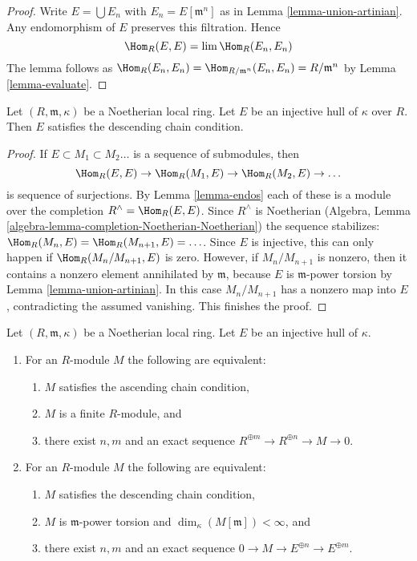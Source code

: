 \begin{proof}
Write $E = \bigcup E_n$ with $E_n = E[\mathfrak m^n]$ as in
Lemma \ref{lemma-union-artinian}. Any endomorphism of $E$
preserves this filtration. Hence
$$
\Hom_R(E, E) = \lim \Hom_R(E_n, E_n)
$$
The lemma follows as
$\Hom_R(E_n, E_n) = \Hom_{R/\mathfrak m^n}(E_n, E_n) = R/\mathfrak m^n$
by Lemma \ref{lemma-evaluate}.
\end{proof}

\begin{lemma}
\label{lemma-injective-hull-has-dcc}
Let $(R, \mathfrak m, \kappa)$ be a Noetherian local ring.
Let $E$ be an injective hull of $\kappa$ over $R$. Then
$E$ satisfies the descending chain condition.
\end{lemma}

\begin{proof}
If $E \subset M_1 \subset M_2 \ldots$ is a sequence of submodules, then
$$
\Hom_R(E, E) \to \Hom_R(M_1, E) \to \Hom_R(M_2, E) \to \ldots
$$
is sequence of surjections. By Lemma \ref{lemma-endos} each of these is a
module over the completion $R^\wedge = \Hom_R(E, E)$.
Since $R^\wedge$ is Noetherian
(Algebra, Lemma \ref{algebra-lemma-completion-Noetherian-Noetherian})
the sequence stabilizes: $\Hom_R(M_n, E) = \Hom_R(M_{n + 1}, E) = \ldots$.
Since $E$ is injective, this can only happen if $\Hom_R(M_n/M_{n + 1}, E)$
is zero. However, if $M_n/M_{n + 1}$ is nonzero, then it contains a
nonzero element annihilated by $\mathfrak m$, because $E$ is
$\mathfrak m$-power torsion by Lemma \ref{lemma-union-artinian}.
In this case $M_n/M_{n + 1}$ has a nonzero map into $E$, contradicting
the assumed vanishing. This finishes the proof.
\end{proof}

\begin{lemma}
\label{lemma-describe-categories}
Let $(R, \mathfrak m, \kappa)$ be a Noetherian local ring.
Let $E$ be an injective hull of $\kappa$.
\begin{enumerate}
\item For an $R$-module $M$ the following are equivalent:
\begin{enumerate}
\item $M$ satisfies the ascending chain condition,
\item $M$ is a finite $R$-module, and
\item there exist $n, m$ and an exact sequence
$R^{\oplus m} \to R^{\oplus n} \to M \to 0$.
\end{enumerate}
\item For an $R$-module $M$ the following are equivalent:
\begin{enumerate}
\item $M$ satisfies the descending chain condition,
\item $M$ is $\mathfrak m$-power torsion and
$\dim_\kappa(M[\mathfrak m]) < \infty$, and
\item there exist $n, m$ and an exact sequence
$0 \to M \to E^{\oplus n} \to E^{\oplus m}$.
\end{enumerate}
\end{enumerate}
\end{lemma}

